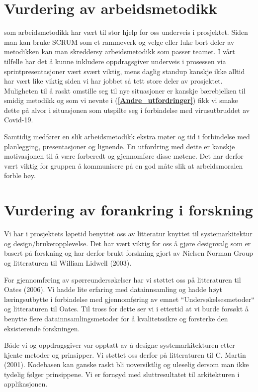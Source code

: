 \section{\textbf{Vurdering av arbeidsmetodikk}} \label{Vurdering_SCRUM}
 som arbeidsmetodikk har vært til stor hjelp for oss underveis i prosjektet. Siden man kan bruke SCRUM som et rammeverk og velge eller luke bort deler av metodikken kan man skreddersy arbeidsmetodikk som passer teamet. I vårt tilfelle har det å kunne inkludere oppdragsgiver underveis i prosessen via sprintpresentasjoner vært svært viktig, mens daglig standup kanskje ikke alltid har vært like viktig siden vi har jobbet så tett store deler av prosjektet. Muligheten til å raskt omstille seg til nye situasjoner er kanskje bærebjelken til smidig metodikk og som vi nevnte i (\textbf{\ref{Andre_utfordringer}}) fikk vi smake dette på alvor i situasjonen som utspilte seg i forbindelse med virusutbruddet av Covid-19. 

Samtidig medfører en slik arbeidsmetodikk ekstra møter og tid i forbindelse med planlegging, presentasjoner og lignende. En utfordring med dette er kanskje motivasjonen til å være forberedt og gjennomføre disse møtene. Det har derfor vært viktig for gruppen å kommunisere på en god måte slik at arbeidsmoralen forble høy. 

\section{\textbf{Vurdering av forankring i forskning}}
Vi har i prosjektets løpetid benyttet oss av litteratur knyttet til systemarkitektur og design/brukeropplevelse. Det har vært viktig for oss å gjøre designvalg som er basert på forskning og har derfor brukt forskning gjort av Nielsen Norman Group og litteraturen til William Lidwell (2003).

For gjennomføring av spørreundersøkelser har vi støttet oss på litteraturen til Oates (2006). Vi hadde lite erfaring med datainnsamling og hadde høyt læringsutbytte i forbindelse med gjennomføring av emnet ``Undersøkelsesmetoder`` og litteraturen til Oates. Til tross for dette ser vi i ettertid at vi burde forsøkt å benytte flere datainnsamlingsmetoder for å kvalitetssikre og forsterke den eksisterende forskningen.

Både vi og oppdragsgiver var opptatt av å designe systemarkitekturen etter kjente metoder og prinsipper. Vi støttet oss derfor på litteraturen til C. Martin (2001). Kodebasen kan ganske raskt bli uoversiktlig og uleselig dersom man ikke tydelig følger prinsippene. Vi er fornøyd med sluttresultatet til arkitekturen i applikasjonen.

